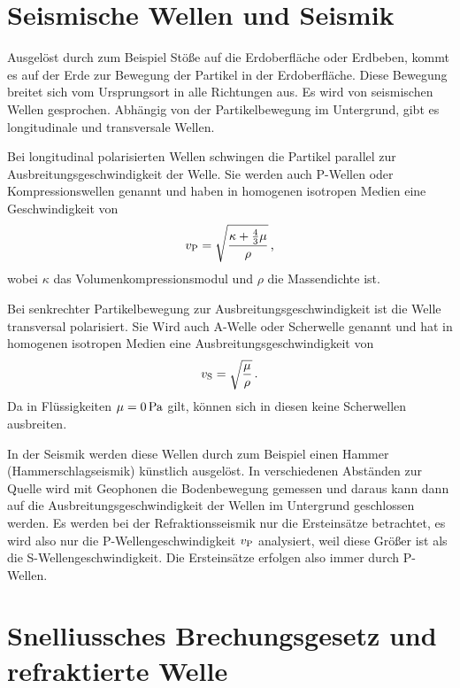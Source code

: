 \section{Seismische Wellen und Seismik}

Ausgelöst durch zum Beispiel Stöße auf die Erdoberfläche oder Erdbeben, kommt es auf der Erde zur Bewegung der Partikel in der Erdoberfläche. Diese Bewegung breitet sich vom Ursprungsort in alle Richtungen aus. Es wird von seismischen Wellen gesprochen. Abhängig von der Partikelbewegung im Untergrund, gibt es longitudinale und transversale Wellen.

Bei longitudinal polarisierten Wellen schwingen die Partikel parallel zur Ausbreitungsgeschwindigkeit der Welle. Sie werden auch P-Wellen oder Kompressionswellen genannt und haben in homogenen isotropen Medien eine Geschwindigkeit von
\begin{equation}
 v_{\mathrm{P}}=\sqrt{\frac{\kappa+\frac{4}{3}\mu}{\rho}} \text{\,,}
\end{equation}
wobei $\kappa$ das Volumenkompressionsmodul und $\rho$ die Massendichte ist.

Bei senkrechter Partikelbewegung zur Ausbreitungsgeschwindigkeit ist die Welle transversal polarisiert. Sie Wird auch A-Welle oder Scherwelle genannt und hat in homogenen isotropen Medien eine Ausbreitungsgeschwindigkeit von
\begin{equation}
 v_{\mathrm{S}}=\sqrt{\frac{\mu}{\rho}} \text{\,.}
\end{equation}
Da in Flüssigkeiten $\mu=0\,\mathrm{Pa}$ gilt, können sich in diesen keine Scherwellen ausbreiten.

In der Seismik werden diese Wellen durch zum Beispiel einen Hammer (Hammerschlagseismik) künstlich ausgelöst. In verschiedenen Abständen zur Quelle wird mit  Geophonen die Bodenbewegung gemessen und daraus kann dann auf die Ausbreitungsgeschwindigkeit der Wellen im Untergrund geschlossen werden. Es werden bei der Refraktionsseismik nur die Ersteinsätze betrachtet, es wird also nur die P-Wellengeschwindigkeit $v_{\mathrm{P}}$ analysiert, weil diese Größer ist als die S-Wellengeschwindigkeit. Die Ersteinsätze erfolgen also immer durch P-Wellen.

\section{Snelliussches Brechungsgesetz und refraktierte Welle} %

